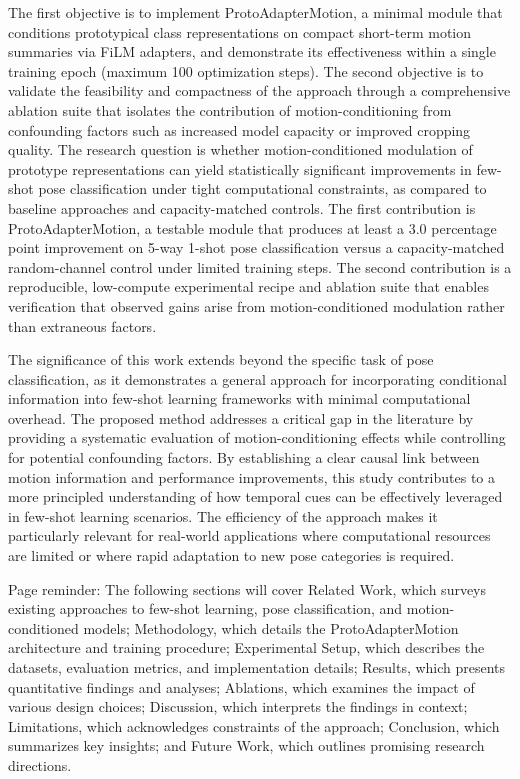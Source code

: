 \documentclass[11pt]{article}
\begin{document}
The first objective is to implement ProtoAdapterMotion, a minimal module that conditions prototypical class representations on compact short-term motion summaries via FiLM adapters, and demonstrate its effectiveness within a single training epoch (maximum 100 optimization steps). The second objective is to validate the feasibility and compactness of the approach through a comprehensive ablation suite that isolates the contribution of motion-conditioning from confounding factors such as increased model capacity or improved cropping quality. The research question is whether motion-conditioned modulation of prototype representations can yield statistically significant improvements in few-shot pose classification under tight computational constraints, as compared to baseline approaches and capacity-matched controls. The first contribution is ProtoAdapterMotion, a testable module that produces at least a 3.0 percentage point improvement on 5-way 1-shot pose classification versus a capacity-matched random-channel control under limited training steps. The second contribution is a reproducible, low-compute experimental recipe and ablation suite that enables verification that observed gains arise from motion-conditioned modulation rather than extraneous factors.

The significance of this work extends beyond the specific task of pose classification, as it demonstrates a general approach for incorporating conditional information into few-shot learning frameworks with minimal computational overhead. The proposed method addresses a critical gap in the literature by providing a systematic evaluation of motion-conditioning effects while controlling for potential confounding factors. By establishing a clear causal link between motion information and performance improvements, this study contributes to a more principled understanding of how temporal cues can be effectively leveraged in few-shot learning scenarios. The efficiency of the approach makes it particularly relevant for real-world applications where computational resources are limited or where rapid adaptation to new pose categories is required.

Page reminder: The following sections will cover Related Work, which surveys existing approaches to few-shot learning, pose classification, and motion-conditioned models; Methodology, which details the ProtoAdapterMotion architecture and training procedure; Experimental Setup, which describes the datasets, evaluation metrics, and implementation details; Results, which presents quantitative findings and analyses; Ablations, which examines the impact of various design choices; Discussion, which interprets the findings in context; Limitations, which acknowledges constraints of the approach; Conclusion, which summarizes key insights; and Future Work, which outlines promising research directions.
\end{document}
